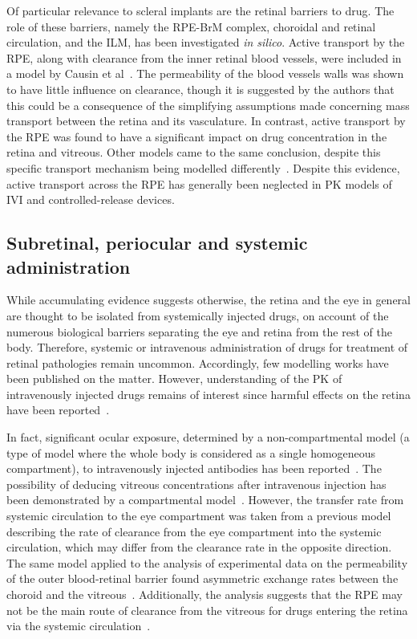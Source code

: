 \documentclass{article}
\begin{document}
Of particular relevance to scleral implants are the retinal barriers to drug.
The role of these barriers, namely the RPE-BrM complex, choroidal and retinal circulation, and the ILM, has been investigated \textit{in silico}.
Active transport by the RPE, along with clearance from the inner retinal blood vessels, were included in a model by Causin et al~\cite{Causin_2016}.
The permeability of the blood vessels walls was shown to have little influence on clearance, though it is suggested by the authors that this could be a consequence of the simplifying assumptions made concerning mass transport between the retina and its vasculature.
In contrast, active transport by the RPE was found to have a significant impact on drug concentration in the retina and vitreous.
Other models came to the same conclusion, despite this specific transport mechanism being modelled differently~\cite{Balachandran_2008,Kotha_2014}.
Despite this evidence, active transport across the RPE has generally been neglected in PK models of IVI and controlled-release devices.


\subsection{Subretinal, periocular and systemic administration}

While accumulating evidence suggests otherwise, the retina and the eye in general are thought to be isolated from systemically injected drugs, on account of the numerous biological barriers separating the eye and retina from the rest of the body.
Therefore, systemic or intravenous administration of drugs for treatment of retinal pathologies remain uncommon.
Accordingly, few modelling works have been published on the matter.
However, understanding of the PK of intravenously injected drugs remains of interest since harmful effects on the retina have been reported~\cite{Fu_2017}.

In fact, significant ocular exposure, determined by a non-compartmental model (a type of model where the whole body is considered as a single homogeneous compartment), to intravenously injected antibodies has been reported~\cite{Shivva_2021}.
The possibility of deducing vitreous concentrations after intravenous injection has been demonstrated by a compartmental model~\cite{Vellonen_2015}.
However, the transfer rate from systemic circulation to the eye compartment was taken from a previous model describing the rate of clearance from the eye compartment into the systemic circulation, which may differ from the clearance rate in the opposite direction.
The same model applied to the analysis of experimental data on the permeability of the outer blood-retinal barrier found asymmetric exchange rates between the choroid and the vitreous~\cite{Ramsay_2019}.
Additionally, the analysis suggests that the RPE may not be the main route of clearance from the vitreous for drugs entering the retina via the systemic circulation~\cite{Ramsay_2019}.
\end{document}
